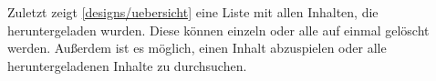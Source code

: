 

Zuletzt zeigt \autoref{designs/uebersicht} eine Liste mit allen Inhalten, die heruntergeladen wurden. Diese können einzeln oder alle auf einmal gelöscht werden. Außerdem ist es möglich, einen Inhalt abzuspielen oder alle heruntergeladenen Inhalte zu durchsuchen.


